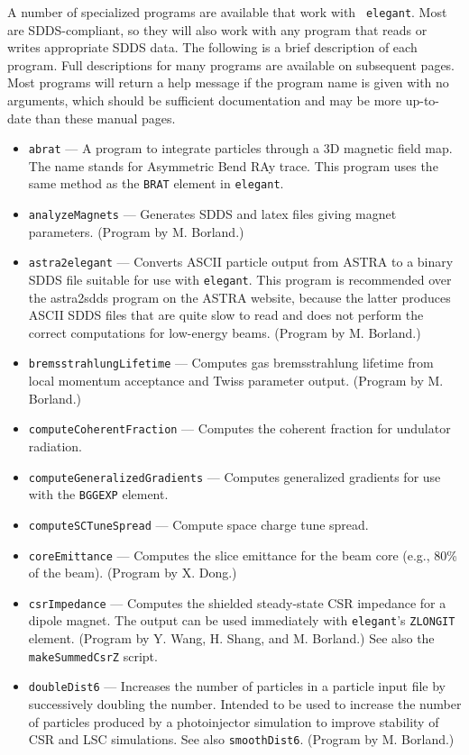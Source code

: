 \documentclass[11pt]{article}
\begin{document}
A number of specialized programs are available that work with {\tt
elegant}. Most are SDDS-compliant, so they will also work with any
program that reads or writes appropriate SDDS data.  The following is
a brief description of each program.  Full descriptions for many programs are available
on subsequent pages.  Most programs will return a help message if the program name is
given with no arguments, which should be sufficient documentation and may be more
up-to-date than these manual pages.
\begin{itemize}
\item {\tt abrat} --- A program to integrate particles through a 3D magnetic field map. The name 
 stands for Asymmetric Bend RAy trace. This program uses the same method as the \verb|BRAT|
 element in {\tt elegant}.
\item {\tt analyzeMagnets} --- Generates SDDS and latex files giving magnet parameters.
  (Program by M. Borland.)
\item {\tt astra2elegant} --- Converts ASCII particle output from ASTRA \cite{ASTRA} to a binary
  SDDS file suitable for use with {\tt elegant}.  This program is recommended over
  the astra2sdds program on the ASTRA website, because the latter produces ASCII SDDS
  files that are quite slow to read and does not perform the correct computations
  for low-energy beams.
  (Program by M. Borland.)
\item {\tt bremsstrahlungLifetime} --- Computes gas bremsstrahlung lifetime from local momentum acceptance and Twiss parameter output.
  (Program by M. Borland.)
\item {\tt computeCoherentFraction} --- Computes the coherent fraction for undulator radiation.
\item {\tt computeGeneralizedGradients} --- Computes generalized gradients for use with the \verb|BGGEXP| element.
\item {\tt computeSCTuneSpread} --- Compute space charge tune spread.
\item {\tt coreEmittance} --- Computes the slice emittance for the beam core (e.g., 80\% of the beam).
  (Program by X. Dong.)
\item {\tt csrImpedance} --- Computes the shielded steady-state CSR impedance for a dipole magnet.
 The output can be used immediately with {\tt elegant}'s \verb|ZLONGIT| element.
 (Program by Y. Wang, H. Shang, and M. Borland.)
 See also the {\tt makeSummedCsrZ} script.
\item {\tt doubleDist6} --- Increases the number of particles in a particle input file by
 successively doubling the number.  Intended to be used to increase the number of particles
 produced by a photoinjector simulation to improve stability of CSR and LSC simulations.
 See also {\tt smoothDist6}.
  (Program by M. Borland.)


\end{itemize}
\end{document}
